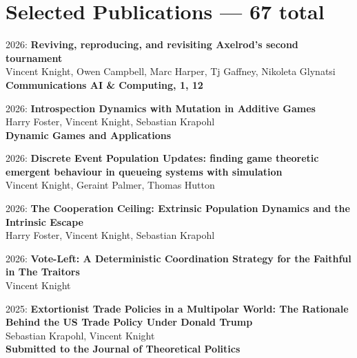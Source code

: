 \documentclass[10pt]{article}
\begin{document}
\section{Selected Publications --- 67 total}

\begin{etaremune}

\item
  2026: \textbf{Reviving, reproducing, and revisiting Axelrod's second tournament}\\
  Vincent Knight, Owen Campbell, Marc Harper, Tj Gaffney, Nikoleta Glynatsi\\
  \textbf{Communications AI \& Computing, 1, 12}\\

\item
  2026: \textbf{Introspection Dynamics with Mutation in Additive Games}\\
  Harry Foster, Vincent Knight, Sebastian Krapohl\\
  \textbf{Dynamic Games and Applications}\\

\item
  2026: \textbf{Discrete Event Population Updates: finding game theoretic emergent behaviour in queueing systems with simulation}\\
  Vincent Knight, Geraint Palmer, Thomas Hutton\\
  

\item
  2026: \textbf{The Cooperation Ceiling: Extrinsic Population Dynamics and the Intrinsic Escape}\\
  Harry Foster, Vincent Knight, Sebastian Krapohl\\
  

\item
  2026: \textbf{Vote-Left: A Deterministic Coordination Strategy for the Faithful in The Traitors}\\
  Vincent Knight\\
  

\item
  2025: \textbf{Extortionist Trade Policies in a Multipolar World: The Rationale Behind the US Trade Policy Under Donald Trump}\\
  Sebastian Krapohl, Vincent Knight\\
  \textbf{Submitted to the Journal of Theoretical Politics}\\


\end{etaremune}
\end{document}

